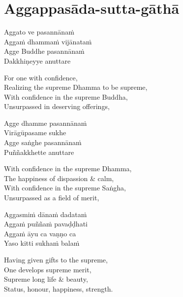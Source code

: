 \suttaRef{[MJG]}

\section{Aggappasāda-sutta-gāthā}
\label{aggappasada-sutta-gatha}

\vspace{-0.6em}

\begin{pali-hang}
  Aggato ve pasannānaṁ\\
  Aggaṁ dhammaṁ vijānataṁ\\
  Agge Buddhe pasannānaṁ\\
  Dakkhiṇeyye anuttare
\end{pali-hang}

\begin{english-verses}
  For one with confidence,\\
  Realizing the supreme Dhamma to be supreme,\\
  With confidence in the supreme Buddha,\\
  Unsurpassed in deserving offerings,
\end{english-verses}

\begin{pali-hang-continued}
  Agge dhamme pasannānaṁ\\
  Virāgūpasame sukhe\\
  Agge saṅghe pasannānaṁ\\
  Puññakkhette anuttare
\end{pali-hang-continued}

\begin{english-verses}
  With confidence in the supreme Dhamma,\\
  The happiness of dispassion \& calm,\\
  With confidence in the supreme Saṅgha,\\
  Unsurpassed as a field of merit,
\end{english-verses}

\begin{pali-hang-continued}
  Aggasmiṁ dānaṁ dadataṁ\\
  Aggaṁ puññaṁ pavaḍḍhati\\
  Aggaṁ āyu ca vaṇṇo ca\\
  Yaso kitti sukhaṁ balaṁ
\end{pali-hang-continued}

\begin{english-verses}
  Having given gifts to the supreme,\\
  One develops supreme merit,\\
  Supreme long life \& beauty,\\
  Status, honour, happiness, strength.
\end{english-verses}

